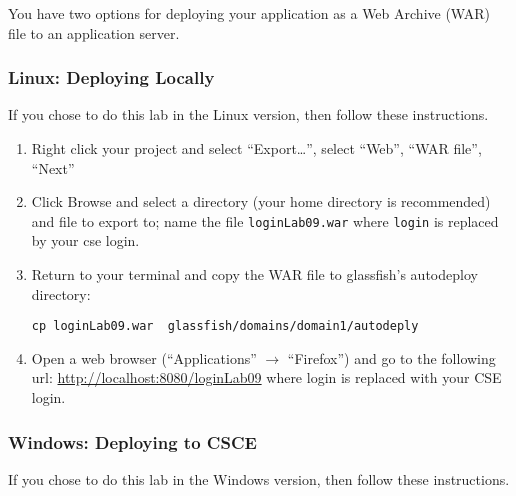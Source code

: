 \documentclass[12pt]{scrartcl}
\begin{document}
You have two options for deploying your application as a Web Archive (WAR) 
file to an application server.  

\subsubsection*{Linux: Deploying Locally}

If you chose to do this lab in the Linux version, then follow these instructions.

\begin{enumerate}
  \item Right click your project and select ``Export\ldots'', select 
	``Web'', ``WAR file'', ``Next''
  \item Click Browse and select a directory (your home directory is 
	recommended) and file to export to; name the file 
	\texttt{loginLab09.war} where \texttt{login}
	is replaced by your cse login.
  \item Return to your terminal and copy the WAR file to glassfish's 
    autodeploy directory:
    
	\texttt{cp loginLab09.war ~glassfish/domains/domain1/autodeply}
 
  \item Open a web browser (``Applications'' $\rightarrow$ ``Firefox'') 
    and go to the following url: \url{http://localhost:8080/loginLab09}
    where login is replaced with your CSE login.
\end{enumerate}

\subsubsection*{Windows: Deploying to CSCE}

If you chose to do this lab in the Windows version, then follow these 
instructions.
\end{document}

